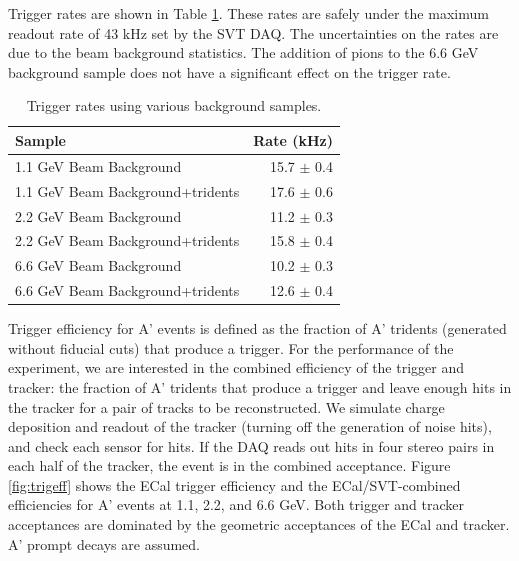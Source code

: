 Trigger rates are shown in Table \ref{tab:trigrates}. These rates are safely under the maximum readout rate of 43 kHz set by the SVT DAQ. The uncertainties on the rates are due to the beam background statistics. 
The addition of pions to the 6.6 GeV background sample does not have a significant effect on the trigger rate.

\begin{table}
	\begin{tabular}{|l|r|}
		\hline
		Sample &  Rate (kHz)\\
		\hline
		1.1 GeV	Beam Background 		& 15.7 $\pm$ 0.4	\\
		1.1 GeV Beam Background+tridents	& 17.6 $\pm$ 0.6	\\
		2.2 GeV	Beam Background			& 11.2 $\pm$ 0.3	\\
		2.2 GeV Beam Background+tridents	& 15.8 $\pm$ 0.4	\\
		6.6 GeV	Beam Background			& 10.2 $\pm$ 0.3	\\
		6.6 GeV Beam Background+tridents	& 12.6 $\pm$ 0.4	\\
		\hline
	\end{tabular}
	\caption{ {\small Trigger rates using various background samples. }
	\label{tab:trigrates}}
\end{table}

Trigger efficiency for A' events is defined as the fraction of A' tridents (generated without fiducial cuts) that produce a trigger.
For the performance of the experiment, we are interested in the combined efficiency of the trigger and tracker: the fraction of A' tridents that produce a trigger and leave enough hits in the tracker for a pair of tracks to be reconstructed.
We simulate charge deposition and readout of the tracker (turning off the generation of noise hits), and check each sensor for hits. 
If the DAQ reads out hits in four stereo pairs in each half of the tracker, the event is in the combined acceptance. 
Figure \ref{fig:trigeff} shows the ECal trigger efficiency and the ECal/SVT-combined efficiencies for A' events at 1.1, 2.2, and 6.6 GeV. 
Both trigger and tracker acceptances are dominated by the geometric acceptances of the ECal and tracker.
A' prompt decays are assumed.

